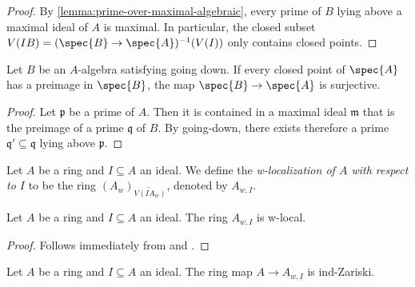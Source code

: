 \begin{proof}
    \leanok
    By \ref{lemma:prime-over-maximal-algebraic}, every prime of $B$ lying above a maximal ideal of $A$
    is maximal. In particular, the closed subset $V(I B) = (\spec{B} \to \spec{A})^{-1}(V(I))$ only contains
    closed points.
\end{proof}

\begin{lemma}
    Let $B$ be an $A$-algebra satisfying going down. If every closed point of $\spec{A}$
    has a preimage in $\spec{B}$, the map $\spec{B} \to \spec{A}$ is surjective.
    \label{lemma:going-down-surjective-of-closed}
    \leanok
\end{lemma}

\begin{proof}
    \leanok
    Let $\mathfrak{p}$ be a prime of $A$. Then it is contained in a maximal ideal $\mathfrak{m}$
    that is the preimage of a prime $\mathfrak{q}$ of $B$. By going-down, there
    exists therefore a prime $\mathfrak{q}' \subseteq \mathfrak{q}$ lying above $\mathfrak{p}$.
\end{proof}

\begin{definition}
  Let $A$ be a ring and $I \subseteq A$ an ideal. We define the \emph{w-localization of $A$ with respect to $I$} to be the ring $(A_w)_{\widetilde{V(IA_{w})}}$, denoted by $A_{w,I}$.
  \label{def:w-localization-ideal}
  \leanok
\end{definition}

\begin{lemma}
  Let $A$ be a ring and $I \subseteq A$ an ideal. The ring $A_{w,I}$ is w-local.
  \label{lemma:w-localization-ideal-w-local}
  \leanok
\end{lemma}

\begin{proof}
  \leanok
  Follows immediately from  and .
\end{proof}

\begin{lemma}
  Let $A$ be a ring and $I \subseteq A$ an ideal. The ring map $A \to A_{w, I}$ is ind-Zariski.
  \label{thm:w-localization-ideal-ind-Zariski}
  \leanok
\end{lemma}

